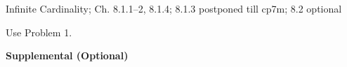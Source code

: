 \documentclass[handout]{mcs}
\begin{document}


\begin{staffnotes}
Infinite Cardinality;  Ch. 8.1.1--2, 8.1.4; 8.1.3 postponed till cp7m; 8.2 optional
\end{staffnotes}


\hint Use Problem 1.




\begin{center}
\textbf{Supplemental (Optional)}
\end{center}



\end{document}
